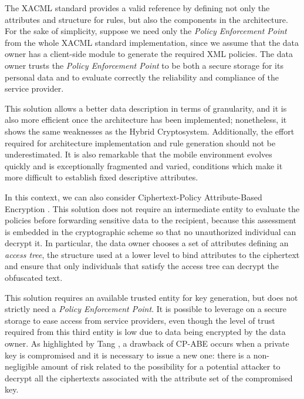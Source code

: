 The XACML standard \cite{standard2005extensible} provides a valid reference by defining not only the attributes and structure for rules, but also the components in the architecture. For the sake of simplicity, suppose we need only the \textit{Policy Enforcement Point} from the whole XACML standard implementation, since we assume that the data owner has a client-side module to generate the required XML policies. The data owner trusts the \textit{Policy Enforcement Point} to be both a secure storage for its personal data and to evaluate correctly the reliability and compliance of the service provider. %

This solution allows a better data description in terms of granularity, and it is also more efficient once the architecture has been implemented; nonetheless, it shows the same weaknesses as the Hybrid Cryptosystem. Additionally, the effort required for architecture implementation and rule generation should not be underestimated. It is also remarkable that the mobile environment evolves quickly and is exceptionally fragmented and varied, conditions which make it more difficult to establish fixed descriptive attributes.

In this context, we can also consider Ciphertext-Policy Attribute-Based Encryption \cite{bethencourt2007ciphertext}. This solution does not require an intermediate entity to evaluate the policies before forwarding sensitive data to the recipient, because this assessment is embedded in the cryptographic scheme so that no unauthorized individual can decrypt it. In particular, the data owner chooses a set of attributes defining an \textit{access tree}, the structure used at a lower level to bind attributes to the ciphertext and ensure that only individuals that satisfy the access tree can decrypt the obfuscated text.

This solution requires an available trusted entity for key generation, but does not strictly need a \textit{Policy Enforcement Point}. It is possible to leverage on a secure storage to ease access from service providers, even though the level of trust required from this third entity is low due to data being encrypted by the data owner. As highlighted by Tang  \cite{tang2008using}, a drawback of CP-ABE occurs when a private key is compromised and it is necessary to issue a new one: there is a non-negligible amount of risk related to the possibility for a potential attacker to decrypt all the ciphertexts associated with the attribute set of the compromised key.

